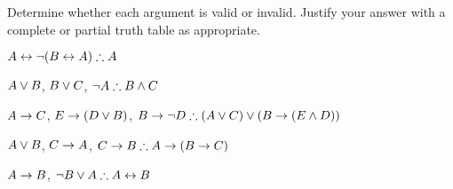 \noindent\problempart Determine whether each argument is valid or invalid. Justify your answer with a complete or partial truth table as appropriate.
\label{pr.TT.valid6} 
\begin{compactlist}
\item $A\eiff\enot(B\eiff A)\therefore A$ %
\item $A\vee B$, $B\vee C$, $\enot A\therefore B \eand C$ %
\item $A \rightarrow C$, $E \rightarrow (D \vee B)$, $B \eif \enot D\therefore (A \eor C) \eor (B \eif (E \eand D))$ %
\item $A \vee B$, $C \rightarrow A$, $C \eif B\therefore A \eif (B \eif C)$ %
\item $A \rightarrow B$, $\enot B \eor A\therefore A \eiff B$ %
\end{compactlist}

